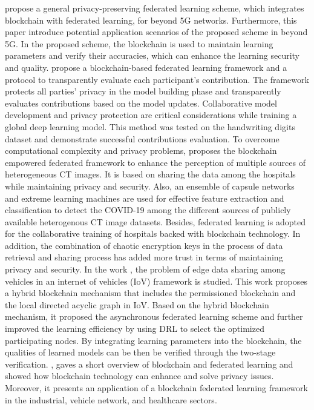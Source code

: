 \documentclass{article}
\begin{document}
\newline \newline \cite{lu_2021} propose a general privacy-preserving federated learning scheme, which integrates blockchain with federated learning, for beyond 5G networks. Furthermore, this paper introduce potential application scenarios of the proposed scheme in beyond 5G. In the proposed scheme, the blockchain is used to maintain learning parameters and verify their accuracies, which can enhance the learning security and quality.
\newline \newline \cite{ma_2021} propose a blockchain-based federated learning framework and a protocol to transparently evaluate each participant's contribution. The framework protects all parties' privacy in the model building phase and transparently evaluates contributions based on the model updates. Collaborative model development and privacy protection are critical considerations while training a global deep learning model. This method was tested on the handwriting digits dataset and demonstrate successful contributions evaluation.
\newline \newline To overcome computational complexity and privacy problems, \cite{durga_fled_2022} proposes the blockchain empowered federated framework to enhance the perception of multiple sources of heterogeneous CT images. It is based on sharing the data among the hospitals while maintaining privacy and security. Also, an ensemble of capsule networks and extreme learning machines are used for effective feature extraction and classification to detect the COVID-19 among the different sources of publicly available heterogenous CT image datasets. Besides, federated learning is adopted for the collaborative training of hospitals backed with blockchain technology. In addition, the combination of chaotic encryption keys in the process of data retrieval and sharing process has added more trust in terms of maintaining privacy and security. 
\newline \newline In the work \cite{lu_2020}, the problem of edge data sharing among vehicles in an internet of vehicles (IoV) framework is studied. This work proposes a hybrid blockchain mechanism that includes the permissioned blockchain and the local directed acyclic graph in IoV. Based on the hybrid blockchain mechanism, it proposed the asynchronous federated learning scheme and further improved the learning efficiency by using DRL to select the optimized participating nodes. By integrating learning parameters into the blockchain, the qualities of learned models can be then be verified through the two-stage verification.
\newline \newline \cite{lee_2021}, gaves a short overview of blockchain and federated learning and showed how blockchain technology can enhance and solve privacy issues. Moreover, it presents an application of a blockchain federated learning framework in the industrial, vehicle network, and healthcare sectors.
\end{document}
